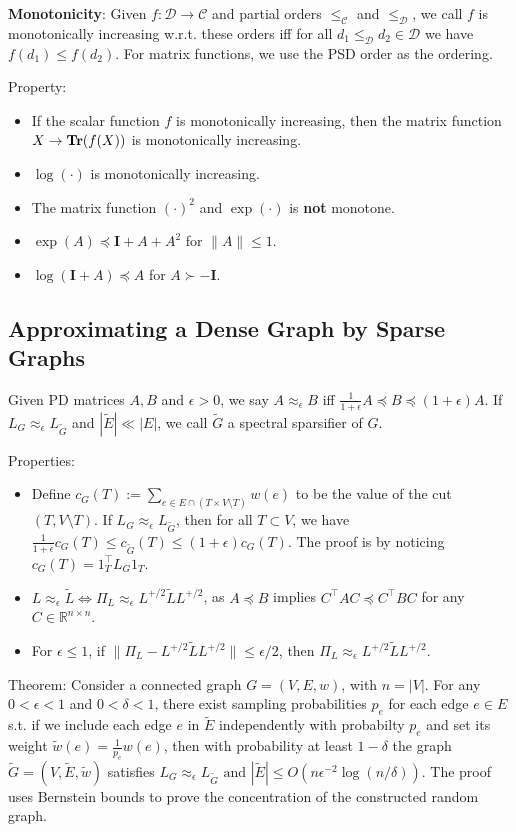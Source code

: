 \textbf{Monotonicity}: Given $f: \mathcal{D} \rightarrow \mathcal{C}$ and partial orders $\le_{\mathcal{C}}$ and $\le_{\mathcal{D}}$, we call $f$ is monotonically increasing w.r.t. these orders iff for all $d_1 \le_{\mathcal{D}} d_2 \in \mathcal{D}$ we have $f(d_1) \le f(d_2)$. For matrix functions, we use the PSD order as the ordering.

Property:
\begin{itemize}
    \item If the scalar function $f$ is monotonically increasing, then the matrix function $X \rightarrow \operatorname{\textbf{Tr}}(f(X))$ is monotonically increasing.
    \item $\log(\cdot)$ is monotonically increasing.
    \item The matrix function $(\cdot)^2$ and $\exp(\cdot)$ is \textbf{not} monotone.
    \item $\exp(A) \preceq \boldsymbol{I} + A + A^2$ for $\|A\| \le 1$.
    \item $\log(\boldsymbol{I}+A) \preceq A$ for $A \succ -\boldsymbol{I}$.
\end{itemize}

\subsection{Approximating a Dense Graph by Sparse Graphs}

Given PD matrices $A, B$ and $\epsilon>0$, we say $A \approx_{\epsilon} B$ iff $\frac{1}{1+\epsilon} A \preceq B \preceq (1+\epsilon) A$. If $L_G \approx_{\epsilon} L_{\tilde{G}}$ and $|\tilde{E}| \ll |E|$, we call $\tilde{G}$ a spectral sparsifier of $G$.

Properties:
\begin{itemize}
    \item Define $c_G(T) := \sum_{e \in E \cap (T\times V\setminus T)} w(e)$ to be the value of the cut $(T, V\setminus T)$. If $L_G \approx_{\epsilon} L_{\tilde{G}}$, then for all $T \subset V$, we have $\frac{1}{1+\epsilon} c_G(T) \le c_{\tilde{G}}(T) \le (1+\epsilon) c_G(T)$. The proof is by noticing $c_G(T) = 1_T^\top L_G 1_T$.
    \item $L \approx_{\epsilon} \tilde{L} \Leftrightarrow \Pi_L \approx_\epsilon L^{+/2} \tilde{L} L^{+/2}$, as $A \preceq B$ implies $C^\top A C \preceq C^\top B C$ for any $C\in \mathbb{R}^{n\times n}$.
    \item For $\epsilon \le 1$, if $\|\Pi_L - L^{+/2} \tilde{L} L^{+/2}\| \le \epsilon/2$, then $\Pi_L \approx_\epsilon L^{+/2} \tilde{L} L^{+/2}$.
\end{itemize}

Theorem: Consider a connected graph $G=(V, E, w)$, with $n=|V|$. For any $0<\epsilon<1$ and $0<\delta<1$, there exist sampling probabilities $p_{e}$ for each edge $e \in E$ s.t. if we include each edge $e$ in $\tilde{E}$ independently with probabilty $p_{e}$ and set its weight $\tilde{w}(e)=\frac{1}{p_{e}} w(e)$, then with probability at least $1-\delta$ the graph $\tilde{G}=(V, \tilde{E}, \tilde{w})$ satisfies
$
L_{G} \approx_{\epsilon} L_{\tilde{G}} \text { and }|\tilde{E}| \leq O\left(n \epsilon^{-2} \log (n / \delta)\right)
$.
The proof uses Bernstein bounds to prove the concentration of the constructed random graph.